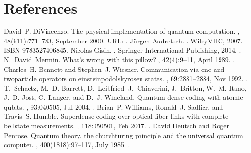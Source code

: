 \documentclass[letterpaper,10pt,english]{jupyterBook}
\begin{document}
\chapter{References}
\label{\detokenize{references:references}}\label{\detokenize{references::doc}}
\begin{sphinxthebibliography}{10}
\sphinxAtStartPar
David P. DiVincenzo. The physical implementation of quantum computation. , 48(9\sphinxhyphen{}11):771–783, September 2000. URL: .
\sphinxAtStartPar
Jürgen Audretsch. . Wiley\sphinxhyphen{}VHC, 2007. ISBN 978\sphinxhyphen{}3\sphinxhyphen{}527\sphinxhyphen{}40684\sphinxhyphen{}5.
\sphinxAtStartPar
Nicolas Gisin. . Springer International Publishing, 2014. .
\sphinxAtStartPar
N. David Mermin. What's wrong with this pillow? , 42(4):9–11, April 1989. .
\sphinxAtStartPar
Charles H. Bennett and Stephen J. Wiesner. Communication via one\sphinxhyphen{} and two\sphinxhyphen{}particle operators on einstein\sphinxhyphen{}podolsky\sphinxhyphen{}rosen states. , 69:2881–2884, Nov 1992. .
\sphinxAtStartPar
T. Schaetz, M. D. Barrett, D. Leibfried, J. Chiaverini, J. Britton, W. M. Itano, J. D. Jost, C. Langer, and D. J. Wineland. Quantum dense coding with atomic qubits. , 93:040505, Jul 2004. .
\sphinxAtStartPar
Brian P. Williams, Ronald J. Sadlier, and Travis S. Humble. Superdense coding over optical fiber links with complete bell\sphinxhyphen{}state measurements. , 118:050501, Feb 2017. .
\sphinxAtStartPar
David Deutsch and Roger Penrose. Quantum theory, the church\sphinxhyphen{}turing principle and the universal quantum computer. , 400(1818):97–117, July 1985. .

\end{sphinxthebibliography}
\end{document}
